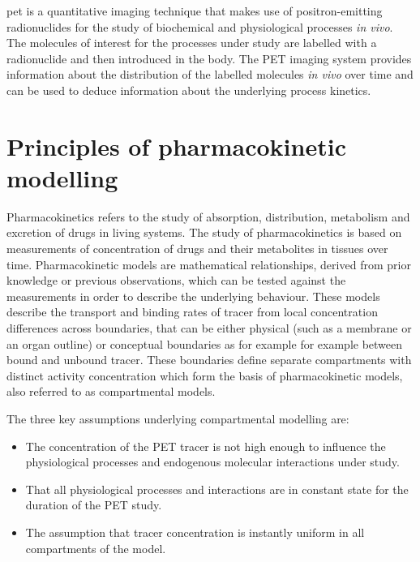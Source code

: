 \Gls{pet} is a quantitative imaging technique that makes use of 
positron-emitting radionuclides for the study of biochemical and physiological processes \textit{in vivo}. The molecules of interest for the processes under study are labelled with a radionuclide and then introduced in the body. The PET imaging system provides information about the distribution of the labelled molecules \textit{in vivo} over time and can be used to deduce information about the underlying process kinetics. 

\section{Principles of pharmacokinetic modelling}
Pharmacokinetics refers to the study of absorption, distribution, metabolism and excretion of drugs in living systems. The study of pharmacokinetics is based on measurements of concentration of drugs and their metabolites in tissues over time. Pharmacokinetic models are mathematical relationships, derived from prior knowledge or previous observations, which can be tested against the measurements in order to describe the underlying behaviour. These models describe the transport and binding rates of tracer from local concentration differences across boundaries, that can be either physical (such as a membrane or an organ outline) or conceptual boundaries as for example for example between bound and unbound tracer. These boundaries define separate compartments with distinct activity concentration which form the basis of pharmacokinetic models, also referred to as compartmental models.

The three key assumptions underlying compartmental modelling are:
\begin{itemize}
\item The concentration of the PET tracer is not high enough to influence the physiological processes and endogenous molecular interactions under study.
\item That all physiological processes and interactions are in constant state for the duration of the PET study.
\item The assumption that tracer concentration is instantly uniform in all compartments of the model.
\end{itemize}

